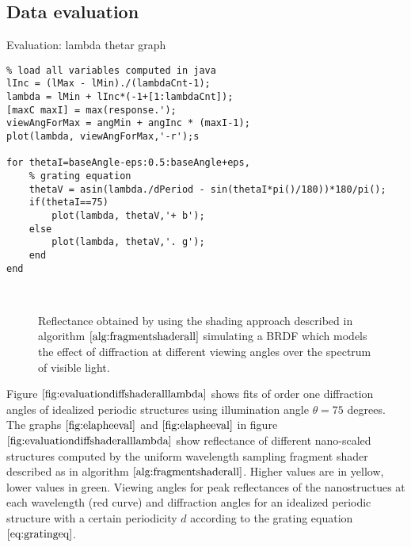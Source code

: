 \subsection{Data evaluation}

\begin{algorithm}[H]
\caption{Evaluation: lambda thetar graph}
\label{alg:evalmatlab}
\begin{lstlisting}
% load all variables computed in java
lInc = (lMax - lMin)./(lambdaCnt-1);
lambda = lMin + lInc*(-1+[1:lambdaCnt]);
[maxC maxI] = max(response.');
viewAngForMax = angMin + angInc * (maxI-1);
plot(lambda, viewAngForMax,'-r');s

for thetaI=baseAngle-eps:0.5:baseAngle+eps,
	% grating equation
	thetaV = asin(lambda./dPeriod - sin(thetaI*pi()/180))*180/pi();
	if(thetaI==75)
		plot(lambda, thetaV,'+ b');
	else
		plot(lambda, thetaV,'. g');
	end
end

\end{lstlisting}
\end{algorithm}

\begin{figure}[H]
  \centering
~
~

  \caption{Reflectance obtained by using the shading approach described in algorithm $\ref{alg:fragmentshaderall}$ simulating a BRDF which models the effect of diffraction at different viewing angles over the spectrum of visible light.}

\label{fig:evaluationdiffshaderalllambda}
\end{figure}

Figure $\ref{fig:evaluationdiffshaderalllambda}$ shows fits of order one diffraction angles of idealized periodic structures using illumination angle $\theta = 75$ degrees. The graphs $\ref{fig:elapheeval}$ and $\ref{fig:elapheeval}$ in figure $\ref{fig:evaluationdiffshaderalllambda}$ show reflectance of different nano-scaled structures computed by the uniform wavelength sampling fragment shader described as in algorithm $\ref{alg:fragmentshaderall}$. Higher values are in yellow, lower values in green. Viewing angles for peak reflectances of the nanostructues at each wavelength (red curve) and diffraction angles for an idealized periodic structure with a certain periodicity $d$ according to the grating equation $\ref{eq:gratingeq}$.

